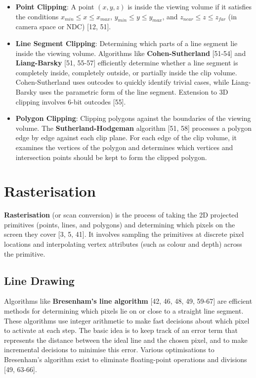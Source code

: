 \documentclass[12pt]{article}
\begin{document}
\begin{itemize}
    \item \textbf{Point Clipping}: A point $(x, y, z)$ is inside the viewing volume if it satisfies the conditions $x_{min} \le x \le x_{max}$, $y_{min} \le y \le y_{max}$, and $z_{near} \le z \le z_{far}$ (in camera space or NDC) [12, 51].
    \item \textbf{Line Segment Clipping}: Determining which parts of a line segment lie inside the viewing volume. Algorithms like \textbf{Cohen-Sutherland} [51-54] and \textbf{Liang-Barsky} [51, 55-57] efficiently determine whether a line segment is completely inside, completely outside, or partially inside the clip volume. Cohen-Sutherland uses outcodes to quickly identify trivial cases, while Liang-Barsky uses the parametric form of the line segment. Extension to 3D clipping involves 6-bit outcodes [55].
    \item \textbf{Polygon Clipping}: Clipping polygons against the boundaries of the viewing volume. The \textbf{Sutherland-Hodgeman} algorithm [51, 58] processes a polygon edge by edge against each clip plane. For each edge of the clip volume, it examines the vertices of the polygon and determines which vertices and intersection points should be kept to form the clipped polygon.
\end{itemize}

\section{Rasterisation}

\textbf{Rasterisation} (or scan conversion) is the process of taking the 2D projected primitives (points, lines, and polygons) and determining which pixels on the screen they cover [3, 5, 41]. It involves sampling the primitives at discrete pixel locations and interpolating vertex attributes (such as colour and depth) across the primitive.

\subsection{Line Drawing}

Algorithms like \textbf{Bresenham's line algorithm} [42, 46, 48, 49, 59-67] are efficient methods for determining which pixels lie on or close to a straight line segment. These algorithms use integer arithmetic to make fast decisions about which pixel to activate at each step. The basic idea is to keep track of an error term that represents the distance between the ideal line and the chosen pixel, and to make incremental decisions to minimise this error. Various optimisations to Bresenham's algorithm exist to eliminate floating-point operations and divisions [49, 63-66].
\end{document}
